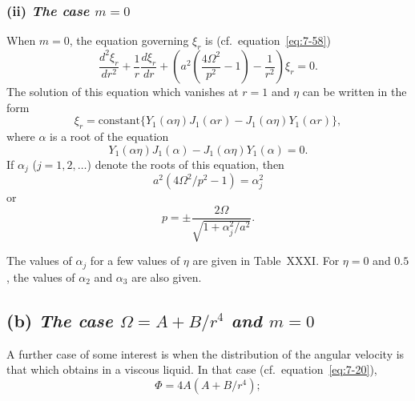 \subsubsection*{(ii) \emph{The case $m = 0$}}
When $m = 0$, the equation governing $\xi_r$ is (cf.\ equation~\eqref{eq:7-58})
\begin{equation}
\label{eq:7-99}
\frac{d^2\xi_r}{dr^2}+\frac{1}{r}\frac{d\xi_r}{dr}
+ \left(a^2\!\left(\frac{4\Omega^2}{p^2}-1\right)
- \frac{1}{r^2}\right)\xi_r = 0.
\end{equation}
The solution of this equation which vanishes at $r = 1$ and $\eta$ can be
written in the form
\begin{equation}
\label{eq:7-100}
\xi_r = \text{constant}\{Y_1(\alpha\eta)J_1(\alpha r) - J_1(\alpha\eta)Y_1(\alpha r)\},
\end{equation}
where $\alpha$ is a root of the equation
\begin{equation}
\label{eq:7-101}
Y_1(\alpha\eta)J_1(\alpha) - J_1(\alpha\eta)Y_1(\alpha) = 0.
\end{equation}
If $\alpha_j$ ($j = 1, 2, \ldots$) denote the roots of this equation, then
\begin{equation}
\label{eq:7-102}
a^2(4\Omega^2/p^2-1) = \alpha_j^2
\end{equation}
or
\begin{equation}
\label{eq:7-103}
p = \pm\frac{2\Omega}{\sqrt{1+\alpha_j^2/a^2}}.
\end{equation}

The values of $\alpha_j$ for a few values of $\eta$ are given in Table~XXXI.  For
$\eta = 0$ and $0.5$, the values of $\alpha_2$ and $\alpha_3$ are also given.

\subsection*{(b) \emph{The case $\Omega = A+B/r^4$ and $m=0$}}
A further case of some interest is when the distribution of the angular
velocity is that which obtains in a viscous liquid.  In that case (cf.\
equation~\eqref{eq:7-20}),
\begin{equation}
\label{eq:7-104}
\Phi = 4A(A+B/r^4);
\end{equation}

